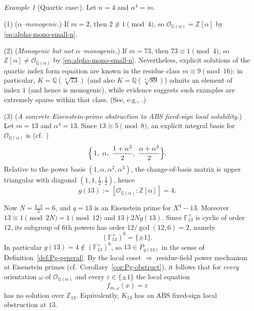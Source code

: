 \documentclass[11pt,letterpaper]{amsart}
\newcommand{\Z}{\mathbb{Z}}
\newcommand{\Q}{\mathbb{Q}}
\newcommand{\F}{\mathbb{F}}
\newcommand{\Ocal}{\mathcal{O}}
\theoremstyle{plain}
\theoremstyle{definition}
\theoremstyle{remark}
\newtheorem{example}[theorem]{Example}
\theoremstyle{plain}
\begin{document}
\begin{example}[Quartic case:]
\label{ex:quartic-73-13}
Let $n=4$ and $\alpha^4=m$.

\smallskip\noindent
(1) (\emph{$\alpha$--monogenic.})
If $m=2$, then $2\not\equiv 1\pmod 4$, so $\Ocal_{\Q(\alpha)}=\Z[\alpha]$ by \eqref{eq:alpha-mono-small-n}.

\smallskip\noindent
(2) (\emph{Monogenic but not $\alpha$--monogenic.})
If $m=73$, then $73\equiv 1\pmod 4$, so $\Z[\alpha]\neq \Ocal_{\Q(\alpha)}$ by \eqref{eq:alpha-mono-small-n}.
Nevertheless, explicit solutions of the quartic index form equation are known in the residue class
$m\equiv 9\pmod{16}$: in particular, $K=\Q(\sqrt[4]{73})$ (and also $K=\Q(\sqrt[4]{89})$) admits an element of
index $1$ (and hence is monogenic), while evidence suggests such examples are extremely sparse within that class.
(See, e.g., \cite[Rem.~5]{GaalRemete2017}.)

\smallskip\noindent
(3) (\emph{A concrete Eisenstein-prime obstruction to ABS fixed-sign local solubility.})
Let $m=13$ and $\alpha^4=13$.  Since $13\equiv 5\pmod 8$, an explicit integral basis for
$\Ocal_{\Q(\alpha)}$ is (cf.\ \cite[\S4, Case $m=5+8k$]{GaalRemete2017})
\[
\Bigl\{\,1,\ \alpha,\ \frac{1+\alpha^2}{2},\ \frac{\alpha+\alpha^3}{2}\Bigr\}.
\]
Relative to the power basis $(1,\alpha,\alpha^2,\alpha^3)$, the change-of-basis matrix is upper triangular
with diagonal $(1,1,\tfrac12,\tfrac12)$, hence
\[
g(13):=[\Ocal_{\Q(\alpha)}:\Z[\alpha]]=4.
\]

Now $N=\frac{4\cdot3}{2}=6$, and $q=13$ is an Eisenstein prime for $X^4-13$.
Moreover $13\equiv 1\pmod{2N}=1\pmod{12}$ and $13\nmid 2Ng(13)$.
Since $\F_{13}^\times$ is cyclic of order $12$, its subgroup of $6$th powers has order
$12/\gcd(12,6)=2$, namely
\[
(\F_{13}^\times)^6=\{\pm1\}.
\]
In particular $g(13)=4\notin(\F_{13}^\times)^6$, so $13\in P_{g(13)}$ in the sense of
Definition~\ref{def:Pg-general}.
By the local coset $\Rightarrow$ residue-field power mechanism at Eisenstein primes
(cf.\ Corollary~\ref{cor:Pg-obstruct}),
it follows that for \emph{every} orientation $\omega$ of $\Ocal_{\Q(\alpha)}$ and every $\varepsilon\in\{\pm1\}$
the local equation
\[
f_{m,\omega}(x)=\varepsilon
\]
has no solution over $\Z_{13}$.  Equivalently, $K_{13}$ has an ABS fixed-sign local obstruction at $13$.
\end{example}
\end{document}
